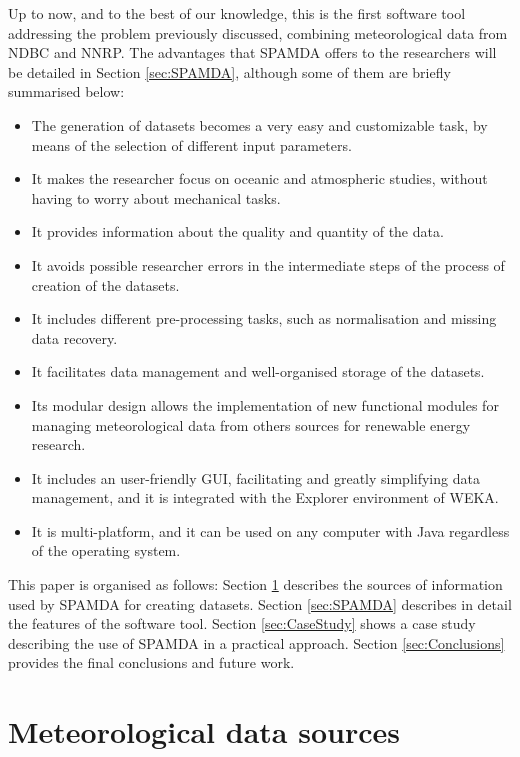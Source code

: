 \documentclass[review]{elsarticle}
\begin{document}
		Up to now, and to the best of our knowledge, this is the first software tool addressing the problem previously discussed, combining meteorological data from NDBC and NNRP. The advantages that SPAMDA offers to the researchers will be detailed in Section \ref{sec:SPAMDA}, although some of them are briefly summarised below:
		\begin{itemize}
			\item The generation of datasets becomes a very easy and customizable task, by means of the selection of different input parameters.
			\item It makes the researcher focus on oceanic and atmospheric studies, without having to worry about mechanical tasks.
			\item It provides information about the quality and quantity of the data.
			\item It avoids possible researcher errors in the intermediate steps of the process of creation of the datasets.
			\item It includes different pre-processing tasks, such as normalisation and missing data recovery.
			\item It facilitates data management and well-organised storage of the datasets.
			\item Its modular design allows the implementation of new functional modules for managing meteorological data from others sources for renewable energy research.
			\item It includes an user-friendly GUI, facilitating and greatly simplifying data management, and it is integrated with the Explorer environment of WEKA.
			\item It is multi-platform, and it can be used on any computer with Java regardless of the operating system.
		\end{itemize}
			
		This paper is organised as follows: Section \ref{sec:DataSources} describes the sources of information used by SPAMDA for creating datasets. Section \ref{sec:SPAMDA} describes in detail the features of the software tool. Section \ref{sec:CaseStudy} shows a case study describing the use of SPAMDA in a practical approach. Section \ref{sec:Conclusions} provides the final conclusions and future work.
		
	\section{Meteorological data sources}\label{sec:DataSources}
		
\end{document}
